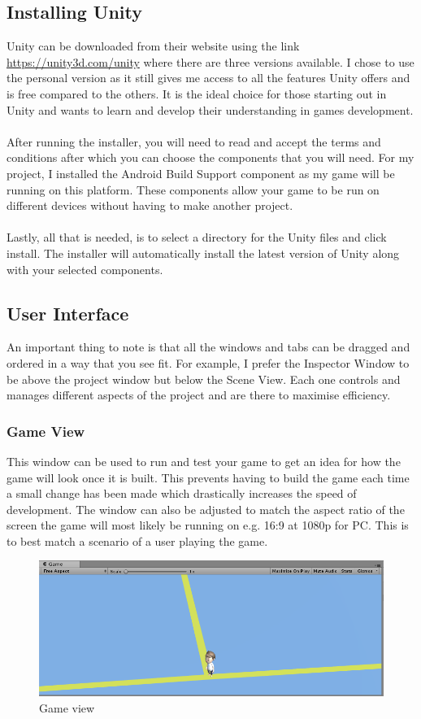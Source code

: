 \documentclass[a4paper]{report}
\begin{document}
\subsection{Installing Unity}
Unity can be downloaded from their website using the link {\url{https://unity3d.com/unity}} where there are three versions available. I chose to use the personal version as it still gives me access to all the features Unity offers and is free compared to the others. It is the ideal choice for those starting out in Unity and wants to learn and develop their understanding in games development.  
\\\\
After running the installer, you will need to read and accept the terms and conditions after which you can choose the components that you will need. For my project, I installed the Android Build Support component as my game will be running on this platform. These components allow your game to be run on different devices without having to make another project.
\\\\
Lastly, all that is needed, is to select a directory for the Unity files and click install. The installer will automatically install the latest version of Unity along with your selected components.

\subsection{User Interface}
An important thing to note is that all the windows and tabs can be dragged and ordered in a way that you see fit. For example, I prefer the Inspector Window to be above the project window but below the Scene View. Each one controls and manages different aspects of the project and are there to maximise efficiency.

\subsubsection{Game View}
This window can be used to run and test your game to get an idea for how the game will look once it is built. This prevents having to build the game each time a small change has been made which drastically increases the speed of development. The window can also be adjusted to match the aspect ratio of the screen the game will most likely be running on e.g. 16:9 at 1080p for PC. This is to best match a scenario of a user playing the game. \cite{Unity}
\begin{figure}[h]
	\centering
	\includegraphics[scale=0.7]{"game view"}
	\caption{Game view}
\end{figure}
\end{document}
